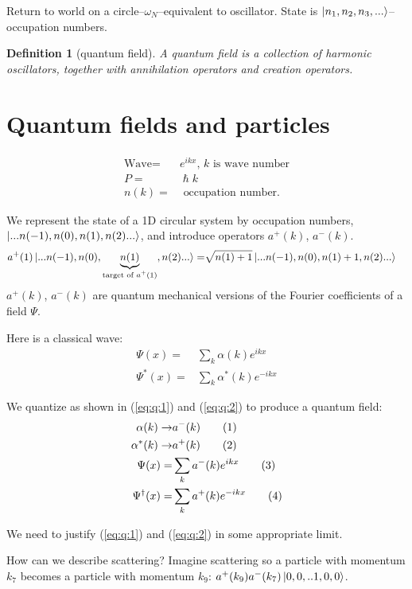 \documentclass[]{article}
\newcommand\numberthis{\addtocounter{equation}{1}\tag{\theequation}}
\newtheorem{defn}[thm]{Definition}
\begin{document}
Return to world on a circle--$\omega_N$--equivalent to oscillator. State is $\ket{n_1,n_2, n_3,...}$--occupation numbers. 
\begin{defn}[quantum field]
	A quantum field is a collection of harmonic oscillators, together with annihilation operators and creation operators.
\end{defn}

\section{Quantum fields and particles}

\begin{align*}
	\text{Wave} =& e^{i k x} \text{, $k$ is wave number}\\
	P=&\hslash k\\
	n(k) =& \text{ occupation number.}
\end{align*}

We represent the state of a 1D circular system by occupation numbers, $\ket{...n(-1), n(0), n(1), n(2)...}$, and introduce operators $a^+(k)$, $a^-(k)$. 
\begin{align*}
a^+(1)\ket{...n(-1), n(0), \underbrace{n(1)}_\text{target of $a^+(1)$}, n(2)...}=& \sqrt{n(1)+1}\ket{...n(-1), n(0), n(1)+1, n(2)...}
\end{align*}
$a^+(k)$, $a^-(k)$ are quantum mechanical versions of the Fourier coefficients of a field $\Psi$.

Here is a classical wave:
\begin{align*}
	\Psi(x) =& \sum_k \alpha(k) e^{ikx}\\
	\Psi^*(x) =& \sum_k \alpha^*(k) e^{-ikx}
\end{align*}

We quantize as shown in (\ref{eq:q:1}) and (\ref{eq:q:2}) to produce a quantum field:
\begin{align*}
	\alpha(k) \rightarrow& a^-(k) \numberthis \label{eq:q:1}\\
	\alpha^*(k) \rightarrow& a^+(k) \numberthis \label{eq:q:2}\\
	\Psi(x) =& \sum_k a^-(k) e^{ikx} \numberthis \label{eq:Psi}\\
	\Psi^\dagger(x) =& \sum_k a^+(k) e^{-ikx} \numberthis \label{eq:Psi:dagger}
\end{align*}

We need to justify (\ref{eq:q:1}) and (\ref{eq:q:2}) in some appropriate limit.

How can we describe scattering? Imagine scattering so a particle with momentum $k_7$ becomes a particle with momentum $k_9$: $a^+(k_9)a^-(k_7)\ket{0,0,..1,0,0}$.
\end{document}

